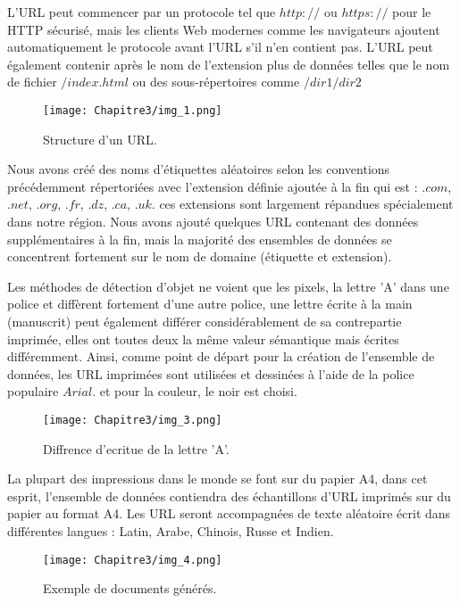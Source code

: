           L'URL peut commencer par un protocole tel que \(http://\) ou \(https://\) pour le HTTP sécurisé, mais les clients Web modernes comme les navigateurs ajoutent automatiquement le protocole avant l'URL s'il n'en contient pas. L'URL peut également contenir après le nom de l'extension plus de données telles que le nom de fichier \(/index.html\) ou des sous-répertoires comme \(/dir1/dir2\)
          \begin{figure}[H]
               \centering
               \texttt{[image: Chapitre3/img\_1.png]}
               \caption{Structure d'un URL.}
               \label{img3}
               \end{figure}

          Nous avons créé des noms d'étiquettes aléatoires selon les conventions précédemment répertoriées avec l'extension définie ajoutée à la fin qui est : \(.com\), \(.net\), \(.org\), \(.fr\), \(.dz\), \(.ca\), \(.uk\). ces extensions sont largement répandues spécialement dans notre région. Nous avons ajouté quelques URL contenant des données supplémentaires à la fin, mais la majorité des ensembles de données se concentrent fortement sur le nom de domaine (étiquette et extension).
          
          Les méthodes de détection d'objet ne voient que les pixels, la lettre 'A' dans une police et diffèrent fortement d'une autre police, une lettre écrite à la main (manuscrit) peut également différer considérablement de sa contrepartie imprimée, elles ont toutes deux la même valeur sémantique mais écrites différemment. Ainsi, comme point de départ pour la création de l'ensemble de données, les URL imprimées sont utilisées et dessinées à l'aide de la police populaire \(Arial\). et pour la couleur, le noir est choisi.
          \begin{figure}[H]
               \centering
               \texttt{[image: Chapitre3/img\_3.png]}
               \caption{Diffrence d'ecritue de la lettre 'A'.}
               \label{img4}
               \end{figure}

          La plupart des impressions dans le monde se font sur du papier A4, dans cet esprit, l'ensemble de données contiendra des échantillons d'URL imprimés sur du papier au format A4. Les URL seront accompagnées de texte aléatoire écrit dans différentes langues : Latin, Arabe, Chinois, Russe et Indien.
          \begin{figure}[H]
               \centering
               \texttt{[image: Chapitre3/img\_4.png]}
               \caption{Exemple de documents générés.}
               \label{img5}
               \end{figure}

